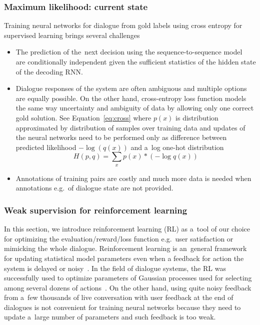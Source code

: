 \documentclass[11pt]{article}
\begin{document}
\subsubsection*{Maximum likelihood: current state}\label{sub:maximum_likelihood}
Training neural networks for dialogue from gold labels using cross entropy for supervised learning brings several challenges
\begin{itemize}
    \item The prediction of the~next decision using the sequence-to-sequence model~\cite{bahdanau_neural_2014,sutskever_sequence_2014} are conditionally independent given the sufficient statistics of the hidden state of the decoding RNN.
    \item Dialogue responses of the system are often ambiguous and multiple options are equally possible.
        On the other hand, cross-entropy loss function models the same way uncertainty and ambiguity of data by allowing only one correct gold solution.
        See Equation~\ref{eq:cross} where $p(x)$ is distribution approximated by distribution of samples over training data and updates of the neural networks need to be performed only as difference between predicted likelihood $-\log(q(x))$ and a~log one-hot distribution
        \begin{equation}\label{eq:cross}
            H(p, q) = \sum_{x}{p(x) * (- \log q(x))}     
        \end{equation}
    \item Annotations of training pairs are costly and much more data is needed when annotations e.g.\ of dialogue state are not provided.
\end{itemize}

\subsubsection*{Weak supervision for reinforcement learning}\label{sub:batch_rl}

In this section, we introduce reinforcement learning (RL) as a~tool of our choice for optimizing the evaluation/reward/loss function e.g.\ user satisfaction or mimicking the whole dialogue.
Reinforcement learning is an~general framework for updating statistical model parameters even when a feedback for action the system is delayed or noisy~\cite{williams2016end,bahdanau_actor-critic_2016,wierstra_recurrent_2010}.
In the field of dialogue systems, the RL was successfully used to optimize parameters of Gaussian processes used for selecting among several dozens of actions~\cite{gasic2011line}.
On the other hand, using quite noisy feedback from a~few thousands of live conversation with user feedback at the end of dialogues is not convenient for training neural networks because they need to update a~large number of parameters and such feedback is too weak.
\end{document}
